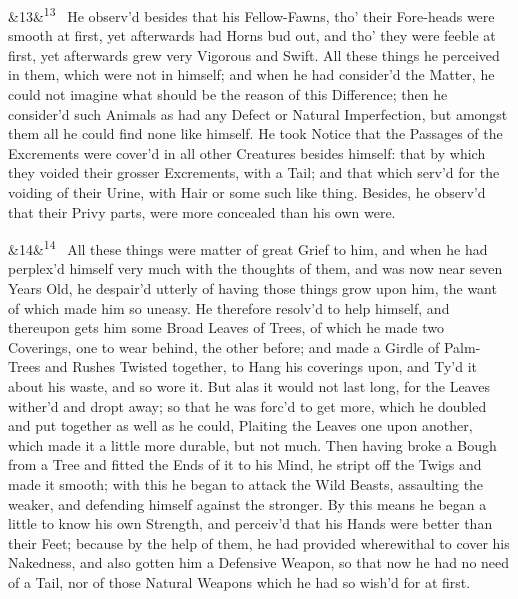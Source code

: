 \documentclass[12pt]{article}
\newcommand{\para}[1][]{\par\noindent\ifx&#1&\else\textsuperscript{\footnotesize #1}~\fi}
\begin{document}
\para[13] He observ'd besides that his Fellow-Fawns, tho' their Fore-heads were smooth at first, yet afterwards had Horns bud out, and tho' they were feeble at first, yet afterwards grew very Vigorous and Swift. All these things he perceived in them, which were not in himself; and when he had consider'd the Matter, he could not imagine what should be the reason of this Difference; then he consider'd such Animals as had any Defect or Natural Imperfection, but amongst them all he could find none like himself. He took Notice that the Passages of the Excrements were cover'd in all other Creatures besides himself: that by which they voided their grosser Excrements, with a Tail; and that which serv'd for the voiding of their Urine, with Hair or some such like thing. Besides, he observ'd that their Privy parts, were more concealed than his own were.

\para[14] All these things were matter of great Grief to him, and when he had perplex'd himself very much with the thoughts of them, and was now near seven Years Old, he despair'd utterly of having those things grow upon him, the want of which made him so uneasy. He therefore resolv'd to help himself, and thereupon gets him some Broad Leaves of Trees, of which he made two Coverings, one to wear behind, the other before; and made a Girdle of Palm-Trees and Rushes Twisted together, to Hang his coverings upon, and Ty'd it about his waste, and so wore it. But alas it would not last long, for the Leaves wither'd and dropt away; so that he was forc'd to get more, which he doubled and put together as well as he could, Plaiting the Leaves one upon another, which made it a little more durable, but not much. Then having broke a Bough from a Tree and fitted the Ends of it to his Mind, he stript off the Twigs and made it smooth; with this he began to attack the Wild Beasts, assaulting the weaker, and defending himself against the stronger. By this means he began a little to know his own Strength, and perceiv'd that his Hands were better than their Feet; because by the help of them, he had provided wherewithal to cover his Nakedness, and also gotten him a Defensive Weapon, so that now he had no need of a Tail, nor of those Natural Weapons which he had so wish'd for at first.
\end{document}
